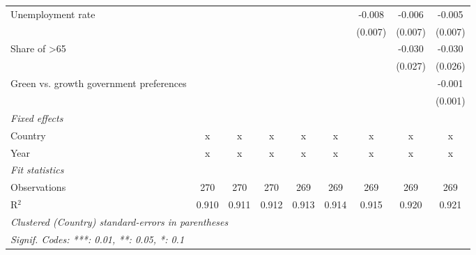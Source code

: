 \begin{table}[htbp]
\begin{tabular}{lcccccccc}
      Unemployment rate                                        &         &         &         &         &         & -0.008  & -0.006  & -0.005\\   
                                                               &         &         &         &         &         & (0.007) & (0.007) & (0.007)\\   
      Share of >65                                             &         &         &         &         &         &         & -0.030  & -0.030\\   
                                                               &         &         &         &         &         &         & (0.027) & (0.026)\\   
      Green vs. growth government preferences                  &         &         &         &         &         &         &         & -0.001\\   
                                                               &         &         &         &         &         &         &         & (0.001)\\   
      \emph{Fixed effects}\\
      Country                                                  & x       & x       & x       & x       & x       & x       & x       & x\\  
      Year                                                     & x       & x       & x       & x       & x       & x       & x       & x\\  
      \midrule \emph{Fit statistics}\\
      Observations                                             & 270     & 270     & 270     & 269     & 269     & 269     & 269     & 269\\  
      R$^2$                                                    & 0.910   & 0.911   & 0.912   & 0.913   & 0.914   & 0.915   & 0.920   & 0.921\\  
      \midrule
      \multicolumn{9}{l}{\emph{Clustered (Country) standard-errors in parentheses}}\\
      \multicolumn{9}{l}{\emph{Signif. Codes: ***: 0.01, **: 0.05, *: 0.1}}\\
   \end{tabular}
\end{table}


